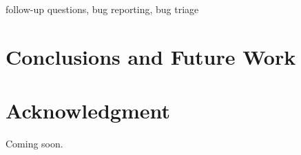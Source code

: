 \documentclass[10pt,conference]{IEEEtran}
\begin{document}
\begin{IEEEkeywords}
follow-up questions, bug reporting, bug triage
\end{IEEEkeywords}











\section{Conclusions and Future Work}

\section*{Acknowledgment}
Coming soon.



\end{document}
